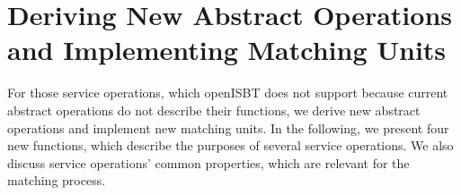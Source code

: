 \section{Deriving New Abstract Operations and Implementing Matching Units}
\label{sec:extending:deriving_new_matching_units}
For those service operations, which openISBT does not support because current abstract operations do not describe their functions, we derive new abstract operations and implement new matching units. In the following, we present four new functions, which describe the purposes of several service operations. We also discuss service operations' common properties, which are relevant for the matching process.





